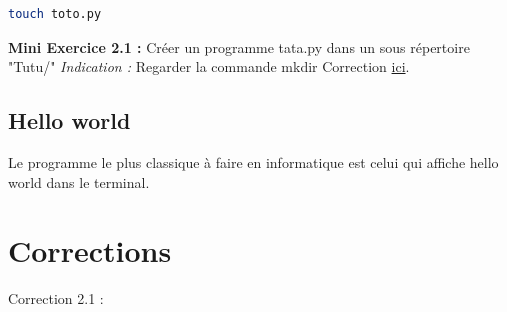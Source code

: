 \documentclass[a4paper,12pt]{article}
\begin{document}
\begin{lstlisting}[language=bash]
touch toto.py
\end{lstlisting}

\noindent\textbf{Mini Exercice 2.1 : } Créer un programme tata.py dans un sous répertoire "Tutu/" \newline
\textit{Indication : } Regarder la commande mkdir \newline
Correction \hyperlink{AncreExo2.1}{ici}.

\subsection{Hello world}

Le programme le plus classique à faire en informatique est celui qui affiche hello world dans le terminal. 

\newpage

\section{Corrections}

\hypertarget{AncreExo2.1}{Correction 2.1 : }
\end{document}
